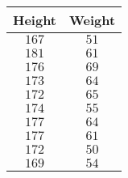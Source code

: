 \begin{tabular}{cc} \toprule
Height & Weight \\\midrule
$167$  & $51$   \\
$181$  & $61$   \\
$176$  & $69$   \\
$173$  & $64$   \\
$172$  & $65$   \\
$174$  & $55$   \\
$177$  & $64$   \\
$177$  & $61$   \\
$172$  & $50$   \\
$169$  & $54$   \\\bottomrule
\end{tabular}
